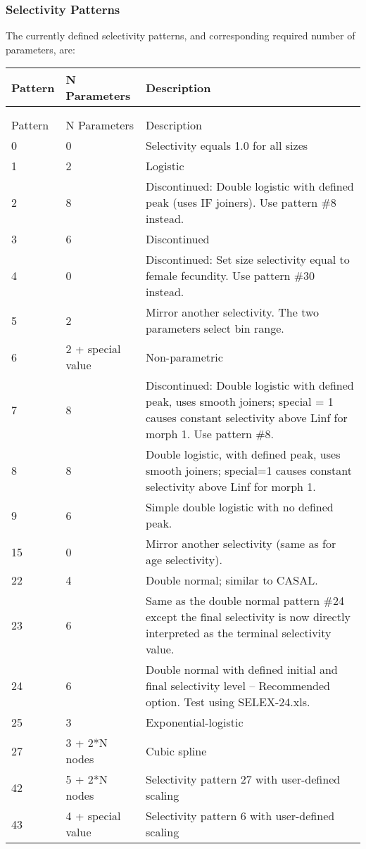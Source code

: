 \pagebreak
\subsubsection{Selectivity Patterns}
The currently defined selectivity patterns, and corresponding required number of parameters, are:

\begin{center}
	\begin{longtable}{p{2cm} p{3cm} p{10cm}}
		\endfirsthead

		\hline
		Pattern & N Parameters & Description \\
		\hline
		\endhead

		\endfoot
		\endlastfoot

		\hline
		\multicolumn{3}{c}{SIZE BASED SELECTIVITY}\\
		  &   &  \\
		Pattern & N Parameters & Description \\
		\hline
		0 & 0 & Selectivity equals 1.0 for all sizes \\
		1 & 2 & Logistic \\
		2 & 8 & Discontinued: Double logistic with defined peak (uses IF joiners). Use pattern \#8 instead.\\
		3 & 6 & Discontinued \\
		4 & 0 & Discontinued: Set size selectivity equal to female fecundity. Use pattern \#30 instead.\\
		5 & 2 & Mirror another selectivity. The two parameters select bin range.\\
		6 & 2 + special value & Non-parametric \\
		7 & 8 & Discontinued: Double logistic with defined peak, uses smooth joiners; special = 1 causes constant selectivity above Linf for morph 1.  Use pattern \#8.\\
		8 & 8 & Double logistic, with defined peak, uses smooth joiners; special=1 causes constant selectivity above Linf for morph 1.  \\
		9 & 6 & Simple double logistic with no defined peak.\\
		15 & 0 & Mirror another selectivity (same as for age selectivity).\\
		22 & 4 & Double normal; similar to CASAL.\\
		23 & 6 & Same as the double normal pattern \#24 except the final selectivity is now directly interpreted as the terminal selectivity value.\\
		24 & 6 & Double normal with defined initial and final selectivity level – Recommended option.  Test using SELEX-24.xls. \\
		25 & 3 & Exponential-logistic \\
		27 & 3 + 2*N nodes & Cubic spline \\
		42 & 5 + 2*N nodes & Selectivity pattern 27 with user-defined scaling \\
		43 & 4 + special value & Selectivity pattern 6 with user-defined scaling \\
		\hline
	\end{longtable}
\end{center}


